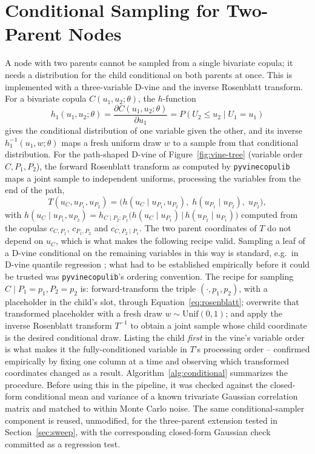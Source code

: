 \documentclass[
  english,
  class=report,
  accentcolor=2c,
  marginpar=false,
  parskip=half-,
  fontsize=11pt,
  ruledheaders=false,
  pdfa=false,
  IMRAD=false,
  thesis={type=master}
]{tudapub}
\begin{document}
\section{Conditional Sampling for Two-Parent Nodes}
\label{sec:conditional}
A node with two parents cannot be sampled from a single bivariate copula;
it needs a distribution for the child conditional on both parents at once.
This is implemented with a three-variable D-vine and the inverse Rosenblatt
transform. For a bivariate copula $C(u_1,u_2;\theta)$, the $h$-function
\begin{equation}
h_1(u_1,u_2;\theta) = \frac{\partial C(u_1,u_2;\theta)}{\partial u_1} =
P(U_2 \le u_2 \mid U_1 = u_1)
\label{eq:hfunc}
\end{equation}
gives the conditional distribution of one variable given the other, and its
inverse $h_1^{-1}(u_1,w;\theta)$ maps a fresh uniform draw $w$ to a sample
from that conditional distribution. For the path-shaped D-vine of
Figure~\ref{fig:vine-tree} (variable order $C, P_1, P_2$), the forward
Rosenblatt transform \parencite{rosenblatt1952} as computed by
\texttt{pyvinecopulib} maps a joint sample to independent uniforms,
processing the variables from the end of the path,
\begin{equation}
T(u_C, u_{P_1}, u_{P_2}) = \bigl(h(u_C \mid u_{P_1}, u_{P_2}),\;
h(u_{P_1} \mid u_{P_2}),\; u_{P_2}\bigr),
\label{eq:rosenblatt}
\end{equation}
with $h(u_C \mid u_{P_1}, u_{P_2}) = h_{C \mid P_2; P_1}\bigl(h(u_C \mid
u_{P_1}) \,\big|\, h(u_{P_2} \mid u_{P_1})\bigr)$ computed from the copulas
$c_{C,P_1}$, $c_{P_1,P_2}$ and $c_{C,P_2\mid P_1}$. The two parent
coordinates of $T$ do not depend on $u_C$, which is what makes the
following recipe valid. Sampling a leaf of a D-vine conditional on the
remaining variables in this way is standard, e.g.\ in D-vine quantile
regression \parencite{kraus2017}; what had to be established empirically
before it could be trusted was \texttt{pyvinecopulib}'s ordering
convention. The recipe for sampling $C \mid P_1{=}p_1, P_2{=}p_2$ is: forward-transform the triple $(\cdot, p_1, p_2)$, with a
placeholder in the child's slot, through Equation~\ref{eq:rosenblatt};
overwrite that transformed placeholder with a fresh draw $w \sim
\text{Unif}(0,1)$; and apply the inverse Rosenblatt transform $T^{-1}$ to
obtain a joint sample whose child coordinate is the desired conditional
draw. Listing the child \emph{first} in the vine's variable order is what
makes it the fully-conditioned variable in $T$'s processing order --
confirmed empirically by fixing one column at a time and observing which
transformed coordinates changed as a result. Algorithm~\ref{alg:conditional}
summarizes the procedure. Before using this in the pipeline, it was checked
against the closed-form conditional mean and variance of a known trivariate
Gaussian correlation matrix and matched to within Monte Carlo noise. The
same conditional-sampler component is reused, unmodified, for the three-parent
extension tested in Section~\ref{sec:sweep}, with the corresponding
closed-form Gaussian check committed as a regression test.
\end{document}
